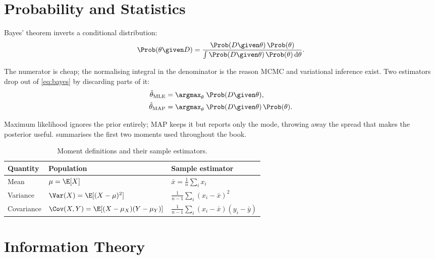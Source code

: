 \section{Probability and Statistics}
\label{sec:probability}

Bayes' theorem inverts a conditional distribution:
%
\begin{equation}
    \Prob(\theta \given D)
        = \frac{\Prob(D \given \theta)\,\Prob(\theta)}
               {\int \Prob(D \given \theta)\,\Prob(\theta)\,\mathrm{d}\theta} .
    \label{eq:bayes}
\end{equation}

The numerator is cheap; the normalising integral in the denominator is the
reason MCMC and variational inference exist. Two estimators drop out of
\cref{eq:bayes} by discarding parts of it:
%
\begin{align}
    \hat{\theta}_{\mathrm{MLE}} &= \argmax_{\theta}\; \Prob(D \given \theta),
        \label{eq:mle} \\
    \hat{\theta}_{\mathrm{MAP}} &= \argmax_{\theta}\; \Prob(D \given \theta)\,\Prob(\theta).
        \label{eq:map}
\end{align}

Maximum likelihood ignores the prior entirely; MAP keeps it but reports only the
mode, throwing away the spread that makes the posterior useful. 
summarises the first two moments used throughout the book.

\begin{table}[H]
    \centering
    \caption{Moment definitions and their sample estimators.}
    \label{tab:moments}
    \begin{tabular}{@{}lll@{}}
        \toprule
        Quantity & Population & Sample estimator \\
        \midrule
        Mean       & $\mu = \E[X]$                    & $\bar{x} = \frac{1}{n}\sum_i x_i$ \\
        Variance   & $\Var(X) = \E[(X-\mu)^2]$        & $\frac{1}{n-1}\sum_i (x_i - \bar{x})^2$ \\
        Covariance & $\Cov(X,Y) = \E[(X-\mu_X)(Y-\mu_Y)]$ & $\frac{1}{n-1}\sum_i (x_i - \bar{x})(y_i - \bar{y})$ \\
        \bottomrule
    \end{tabular}
\end{table}

\section{Information Theory}
\label{sec:information-theory}

